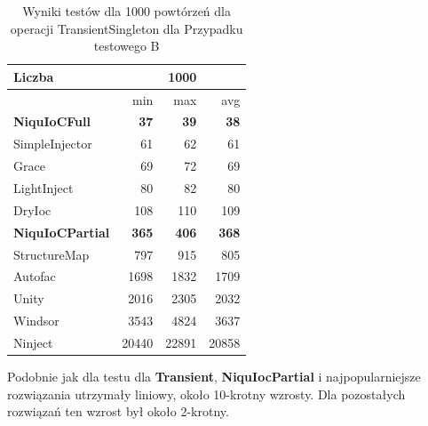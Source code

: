 \documentclass[12pt]{article}
\begin{document}
\begin{table}[H]
\captionsetup{belowskip=0pt,aboveskip=0pt}
\begin{center}
\begin{small}
	\begin{tabular}{ | l | r r r | }
    		\hline
Liczba & & 1000 & \\ \hline
 & min & max & avg \\ \hline
\textbf{NiquIoCFull} & \textbf{37} & \textbf{39} & \textbf{38} \\ \hline
SimpleInjector & 61 & 62 & 61 \\ \hline
Grace & 69 & 72 & 69 \\ \hline
LightInject & 80 & 82 & 80 \\ \hline
DryIoc & 108 & 110 & 109 \\ \hline
\textbf{NiquIoCPartial} & \textbf{365} & \textbf{406} & \textbf{368} \\ \hline
StructureMap & 797 & 915 & 805 \\ \hline
Autofac & 1698 & 1832 & 1709 \\ \hline
Unity & 2016 & 2305 & 2032 \\ \hline
Windsor & 3543 & 4824 & 3637 \\ \hline
Ninject & 20440 & 22891 & 20858 \\ \hline
  	\end{tabular}
\end{small}
\end{center}
\caption{Wyniki testów dla 1000 powtórzeń dla operacji TransientSingleton dla Przypadku testowego B}
\label{TestCaseB_TransientSingleton1000}
\end{table}
Podobnie jak dla testu dla \textbf{Transient}, \textbf{NiquIocPartial} i najpopularniejsze rozwiązania utrzymały liniowy, około 10-krotny wzrosty. Dla pozostałych rozwiązań ten wzrost był około 2-krotny.
\end{document}
